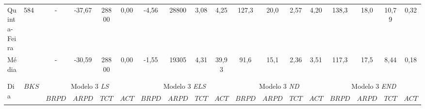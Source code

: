 \begin{landscape}
\begin{table}[H]
\begin{tabular}{llcccccccccccccccc}
Quinta-Feira         & \multicolumn{1}{l|}{584}                    & -                    & -37,67               & \multicolumn{1}{c|}{28800} & 0,00                       & -4,56                & \multicolumn{1}{c|}{28800} & 3,08                 & 4,25                       & 127,3                & \multicolumn{1}{c|}{20,0}  & 2,57                 & 4,20                       & 138,3                & \multicolumn{1}{c|}{18,0}  & 10,79                & 0,32                 \\
Média                & \multicolumn{1}{l|}{}                       & -                    & -30,59               & \multicolumn{1}{c|}{28800} & 0,00                       & -1,55                & \multicolumn{1}{c|}{19305} & 4,31                 & 39,93                      & 91,6                 & \multicolumn{1}{c|}{15,1}  & 2,36                 & 3,51                       & 117,3                & \multicolumn{1}{c|}{17,5}  & 8,44                 & 0,18                 \\
                     &                                             & \multicolumn{1}{l}{} & \multicolumn{1}{l}{} & \multicolumn{1}{l}{}       & \multicolumn{1}{l}{}       & \multicolumn{1}{l}{} & \multicolumn{1}{l}{}       & \multicolumn{1}{l}{} & \multicolumn{1}{l}{}       & \multicolumn{1}{l}{} & \multicolumn{1}{l}{}       & \multicolumn{1}{l}{} & \multicolumn{1}{l}{}       & \multicolumn{1}{l}{} & \multicolumn{1}{l}{}       & \multicolumn{1}{l}{} & \multicolumn{1}{l}{} \\
                     &                                             & \multicolumn{1}{l}{} & \multicolumn{1}{l}{} & \multicolumn{1}{l}{}       & \multicolumn{1}{l}{}       & \multicolumn{1}{l}{} & \multicolumn{1}{l}{}       & \multicolumn{1}{l}{} & \multicolumn{1}{l}{}       & \multicolumn{1}{l}{} & \multicolumn{1}{l}{}       & \multicolumn{1}{l}{} & \multicolumn{1}{l}{}       & \multicolumn{1}{l}{} & \multicolumn{1}{l}{}       & \multicolumn{1}{l}{} & \multicolumn{1}{l}{} \\
\multirow{2}{*}{Dia} & \multicolumn{1}{l|}{\multirow{2}{*}{$BKS$}} & \multicolumn{4}{c|}{Modelo 3 \textit{LS}}                                            & \multicolumn{4}{c|}{Modelo 3 \textit{ELS}}                                           & \multicolumn{4}{c|}{Modelo 3 \textit{ND}}                                            & \multicolumn{4}{c}{Modelo 3 \textit{END}}                                      \\
                     & \multicolumn{1}{l|}{}                       & $BRPD$               & $ARPD$               & $TCT$                      & \multicolumn{1}{c|}{$ACT$} & $BRPD$               & $ARPD$                     & $TCT$                & \multicolumn{1}{c|}{$ACT$} & $BRPD$               & $ARPD$                     & $TCT$                & \multicolumn{1}{c|}{$ACT$} & $BRPD$               & $ARPD$                     & $TCT$                & $ACT$                \\ \hline

\end{tabular}
\end{table}
\end{landscape}
